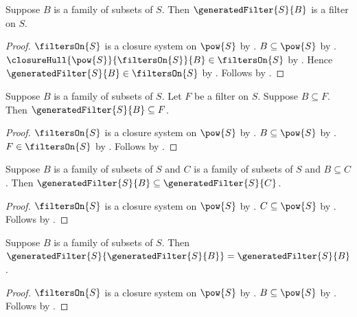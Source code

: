 \begin{classification}\label{generated_filter_is_filter}
    Suppose $B$ is a family of subsets of $S$.
    Then $\generatedFilter{S}{B}$ is a filter on $S$.
\end{classification}
\begin{proof}
    $\filtersOn{S}$ is a closure system on $\pow{S}$ by
        .
    $B\subseteq\pow{S}$ by .
    $\closureHull{\pow{S}}{\filtersOn{S}}{B}
        \in\filtersOn{S}$ by .
    Hence $\generatedFilter{S}{B}\in\filtersOn{S}$ by
        .
    Follows by .
\end{proof}

\begin{theorem}\label{generated_filter_least}
    Suppose $B$ is a family of subsets of $S$.
    Let $F$ be a filter on $S$.
    Suppose $B\subseteq F$.
    Then $\generatedFilter{S}{B}\subseteq F$.
\end{theorem}
\begin{proof}
    $\filtersOn{S}$ is a closure system on $\pow{S}$ by
        .
    $B\subseteq\pow{S}$ by .
    $F\in\filtersOn{S}$ by .
    Follows by
        .
\end{proof}

\begin{proposition}\label{generated_filter_monotone}
    Suppose $B$ is a family of subsets of $S$ and
        $C$ is a family of subsets of $S$ and $B\subseteq C$.
    Then $\generatedFilter{S}{B}\subseteq\generatedFilter{S}{C}$.
\end{proposition}
\begin{proof}
    $\filtersOn{S}$ is a closure system on $\pow{S}$ by
        .
    $C\subseteq\pow{S}$ by .
    Follows by
        .
\end{proof}

\begin{proposition}\label{generated_filter_idempotent}
    Suppose $B$ is a family of subsets of $S$.
    Then $\generatedFilter{S}{\generatedFilter{S}{B}}
        =\generatedFilter{S}{B}$.
\end{proposition}
\begin{proof}
    $\filtersOn{S}$ is a closure system on $\pow{S}$ by
        .
    $B\subseteq\pow{S}$ by .
    Follows by
        .
\end{proof}

